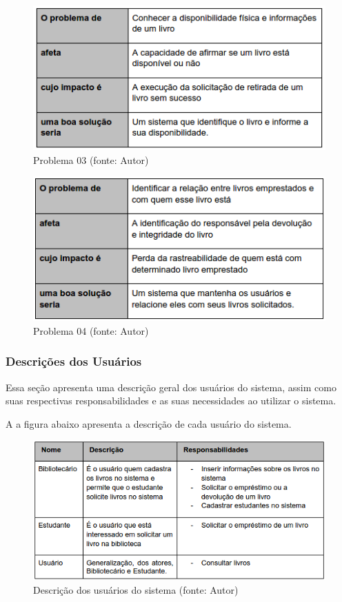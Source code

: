 \begin{figure}[!h]
\centering
\includegraphics[scale=0.65, angle = 360]{figuras/descricao_problema3}
\caption[]{Problema 03 (fonte: Autor)}
\end{figure}
\FloatBarrier

\begin{figure}[!h]
\centering
\includegraphics[scale=0.65, angle = 360]{figuras/descricao_problema4}
\caption[]{Problema 04 (fonte: Autor)}
\end{figure}
\FloatBarrier

\subsubsection{Descrições dos Usuários}
Essa seção apresenta uma descrição geral dos usuários do sistema, assim como suas respectivas responsabilidades e as suas necessidades ao utilizar o sistema.

A a figura abaixo apresenta a descrição de cada usuário do sistema.

\begin{figure}[!h]
\centering
\includegraphics[scale=0.65, angle = 360]{figuras/descricao_usuarios_soft}
\caption[]{Descrição dos usuários do sistema (fonte: Autor)}
\end{figure}
\FloatBarrier

